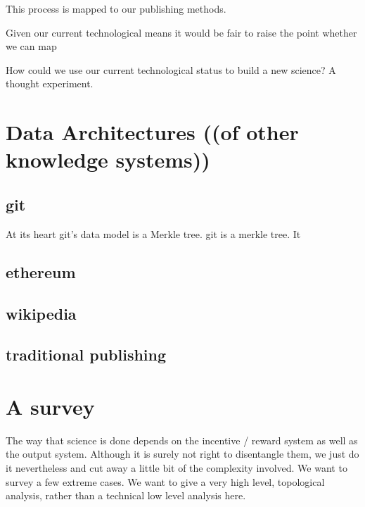 \documentclass[14pt]{article}
\newcommand{\remark}[1]{{\color{purple} (#1)}}
\begin{document}
This process is mapped to our publishing methods.

Given our current technological means it would be fair to raise the point whether we can map 


How could we use our current technological status to build a new science? A thought experiment.


\section{Data Architectures \remark{(of other knowledge systems)}}

\subsection{git}
At its heart git's data model is a Merkle tree. 
git is a merkle tree. It 


\subsection{ethereum}

\subsection{wikipedia}

\subsection{traditional publishing}




\section{A survey}

The way that science is done depends on the incentive / reward system as well as the output system. Although it is surely not right to disentangle them, we just do it nevertheless and cut away a little bit of the complexity involved. We want to survey a few extreme cases. We want to give a very high level, topological analysis, rather than a technical low level analysis here. 
\end{document}
